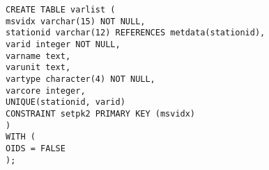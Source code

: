 \noindent \texttt{CREATE TABLE var\textunderscore list (\\
\indent msvidx varchar(15) NOT NULL,\\
\indent stationid varchar(12) REFERENCES met\textunderscore data(stationid),\\
\indent varid integer NOT NULL,\\
\indent varname text,\\
\indent varunit text,\\
\indent vartype character(4) NOT NULL,\\
\indent varcore integer,\\
\indent UNIQUE(stationid, varid)\\
\indent CONSTRAINT set\textunderscore pk2 PRIMARY KEY (msvidx)\\
)\\
WITH (\\
\indent OIDS = FALSE\\
);}\\

